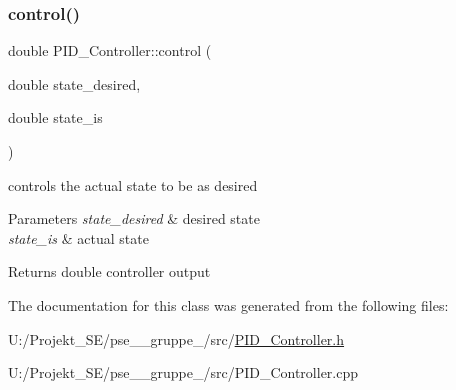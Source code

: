 \subsubsection{\texorpdfstring{control()}{control()}}
{\footnotesize\ttfamily double P\+I\+D\+\_\+\+Controller\+::control (\begin{DoxyParamCaption}\item[{double}]{state\+\_\+desired,  }\item[{double}]{state\+\_\+is }\end{DoxyParamCaption})}



controls the actual state to be as desired 


\begin{DoxyParams}{Parameters}
{\em state\+\_\+desired} & desired state \\
\hline
{\em state\+\_\+is} & actual state \\
\hline
\end{DoxyParams}
\begin{DoxyReturn}{Returns}
double controller output 
\end{DoxyReturn}


The documentation for this class was generated from the following files\+:\begin{DoxyCompactItemize}
\item 
U\+:/\+Projekt\+\_\+\+S\+E/pse\+\_\+\_\+gruppe\+\_/src/\mbox{\hyperlink{_p_i_d___controller_8h}{P\+I\+D\+\_\+\+Controller.\+h}}\item 
U\+:/\+Projekt\+\_\+\+S\+E/pse\+\_\+\_\+gruppe\+\_/src/P\+I\+D\+\_\+\+Controller.\+cpp\end{DoxyCompactItemize}

